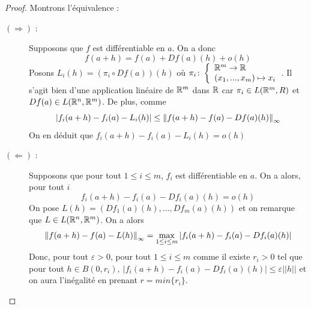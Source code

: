                 \begin{proof}
                Montrons l'équivalence :
                    \begin{description}
                        \item[$(\Rightarrow)$ :] Supposons que $f$ est différentiable en $a$. On a donc 
                        \begin{equation*}
                            f(a+h)=f(a)+Df(a)(h)+o(h)
                        \end{equation*}
                        Posons $L_i(h)=(\pi_i\circ Df(a))(h)$ où $\pi_i\colon \left\{\begin{array}{l}\mathbb{R}^m\to \mathbb{R} \\(x_1,...,x_m)\mapsto x_i\end{array}\right.$. Il s'agit bien d'une application linéaire de $\mathbb{R}^m$ dans $\mathbb{R}$ car $\pi_i\in L(\mathbb{R}^m,R)$ et $Df(a)\in L(\mathbb{R}^n,\mathbb{R}^m)$. De plus, comme 
                        \begin{equation*}
                            |f_i(a+h)-f_i(a)-L_i(h)|\leq \left\| f(a+h)-f(a)-Df(a)(h) \right\|_{\infty}
                        \end{equation*}
                        On en déduit que $f_i(a+h)-f_i(a)-L_{i}(h)=o(h)$
                        \item[$(\Leftarrow)$ :] Supposons que pour tout $1\leq i\leq m$, $f_i$ est différentiable en $a$. On a alors, pour tout $i$
                        \begin{equation*}
                            f_i(a+h)-f_i(a)-Df_i(a)(h)=o(h)
                        \end{equation*}
                        On pose $L(h)=(Df_1(a)(h),...,Df_m(a)(h))$ et on remarque que $L\in L(\mathbb{R}^n,\mathbb{R}^m)$. On a alors
                        \begin{equation}
                            \left\| f(a+h)-f(a)-L(h) \right\|_{\infty}=\max_{1\leq i\leq m}|f_i(a+h)-f_i(a)-Df_i(a)(h)|
                        \end{equation}
                    Donc,  pour tout $\varepsilon>0$, pour tout $1\leq i\leq m$ comme il existe $r_i>0$ tel que pour tout $h\in B(0,r_i),\ |f_i(a+h)-f_i(a)-Df_i(a)(h)|\leq \varepsilon||h||$ et on aura l'inégalité en prenant  $r= min\{r_i\}$.
                    \end{description}
                \end{proof}

